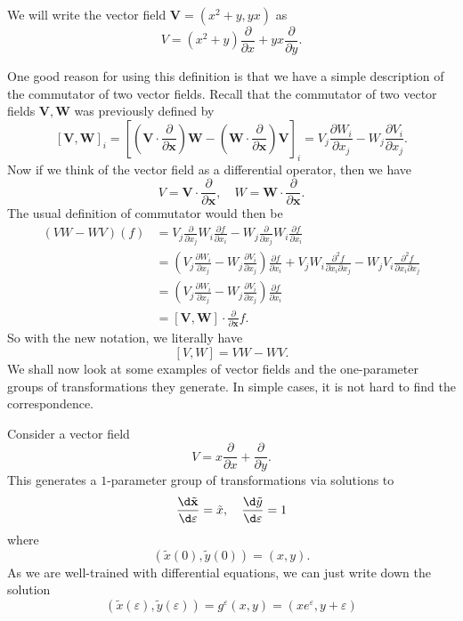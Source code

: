 \documentclass[a4paper]{article}
\begin{document}
\begin{eg}
  We will write the vector field $\mathbf{V} = (x^2 + y, yx)$ as
  \[
    V = (x^2 + y) \frac{\partial}{\partial x} + yx \frac{\partial}{\partial y}.
  \]
\end{eg}
One good reason for using this definition is that we have a simple description of the commutator of two vector fields. Recall that the commutator of two vector fields $\mathbf{V}, \mathbf{W}$ was previously defined by
\[
  [\mathbf{V}, \mathbf{W}]_i = \left[\left(\mathbf{V}\cdot \frac{\partial}{\partial \mathbf{x}}\right) \mathbf{W} - \left(\mathbf{W}\cdot \frac{\partial}{\partial \mathbf{x}}\right) \mathbf{V}\right]_i = V_j \frac{\partial W_i}{\partial x_j} - W_j \frac{\partial V_i}{\partial x_j}.
\]
Now if we think of the vector field as a differential operator, then we have
\[
  V = \mathbf{V}\cdot \frac{\partial}{\partial \mathbf{x}},\quad W = \mathbf{W}\cdot \frac{\partial}{\partial \mathbf{x}}.
\]
The usual definition of commutator would then be
\begin{align*}
  (VW - WV)(f) &= V_j \frac{\partial}{\partial x_j}W_i \frac{\partial f}{\partial x_i} - W_j \frac{\partial}{\partial x_j} W_i \frac{\partial f}{\partial x_i}\\
  &= \left(V_j \frac{\partial W_i}{\partial x_j} - W_j \frac{\partial V_i}{\partial x_j}\right) \frac{\partial f}{\partial x_i} + V_j W_i \frac{\partial^2 f}{\partial x_i \partial x_j} - W_j V_i \frac{\partial^2 f}{\partial x_i \partial x_j}\\
  &= \left(V_j \frac{\partial W_i}{\partial x_j} - W_j \frac{\partial V_i}{\partial x_j}\right) \frac{\partial f}{\partial x_i}\\
  &= [\mathbf{V}, \mathbf{W}] \cdot \frac{\partial}{\partial \mathbf{x}} f.
\end{align*}
So with the new notation, we literally have
\[
  [V, W] = VW - WV.
\]
We shall now look at some examples of vector fields and the one-parameter groups of transformations they generate. In simple cases, it is not hard to find the correspondence.

\begin{eg}
  Consider a vector field
  \[
    V = x \frac{\partial}{\partial x} + \frac{\partial}{\partial y}.
  \]
  This generates a $1$-parameter group of transformations via solutions to
  \[
    \frac{\d \tilde{\mathbf{x}}}{\d \varepsilon} = \tilde{x}, \quad \frac{\d \tilde{y}}{\d \varepsilon} = 1
  \]
  where
  \[
    (\tilde{x}(0), \tilde{y}(0)) = (x, y).
  \]
  As we are well-trained with differential equations, we can just write down the solution
  \[
    (\tilde{x}(\varepsilon), \tilde{y}(\varepsilon)) = g^\varepsilon (x, y) = (xe^{\varepsilon}, y + \varepsilon)
  \]
\end{eg}
\end{document}
